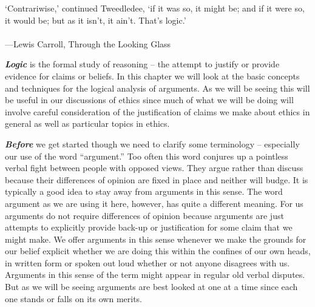 \documentclass[
  12pt, openany]{book}
\newenvironment{epigraph}%
{
\begin{flushright}
\begin{minipage}{30em}
\begin{flushright}
\itshape
}%
{
\end{flushright}
\end{minipage}
\end{flushright}
\vspace{1em}
}
\begin{document}
\begin{epigraph}

`Contrariwise,' continued Tweedledee, `if it was so, it might be; and if it were so, it would be; but as it isn't, it ain't. That's logic.'\\
~\\
---Lewis Carroll, Through the Looking Glass

\end{epigraph}

\textbf{\emph{Logic}} is the formal study of reasoning -- the attempt to justify or provide evidence for claims or beliefs. In this chapter we will look at the basic concepts and techniques for the logical analysis of arguments. As we will be seeing this will be useful in our discussions of ethics since much of what we will be doing will involve careful consideration of the justification of claims we make about ethics in general as well as particular topics in ethics.

\textbf{\emph{Before}} we get started though we need to clarify some terminology -- especially our use of the word ``argument.'' Too often this word conjures up a pointless verbal fight between people with opposed views. They argue rather than discuss because their differences of opinion are fixed in place and neither will budge. It is typically a good idea to stay away from arguments in this sense. The word argument as we are using it here, however, has quite a different meaning. For us arguments do not require differences of opinion because arguments are just attempts to explicitly provide back-up or justification for some claim that we might make. We offer arguments in this sense whenever we make the grounds for our belief explicit whether we are doing this within the confines of our own heads, in written form or spoken out loud whether or not anyone disagrees with us. Arguments in this sense of the term might appear in regular old verbal disputes. But as we will be seeing arguments are best looked at one at a time since each one stands or falls on its own merits.
\end{document}
